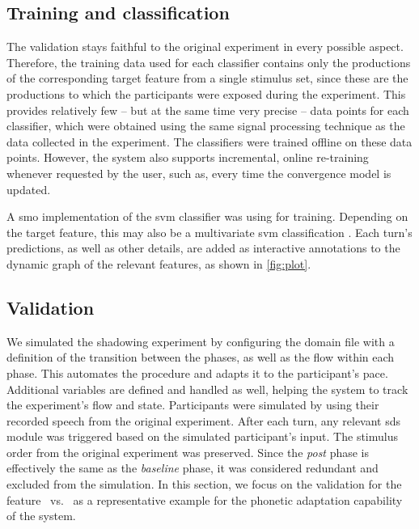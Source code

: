 \subsection{Training and classification}
\label{subsec:training_and_classification}

The validation stays faithful to the original experiment in every possible aspect.
Therefore, the training data used for each classifier contains only the productions of the corresponding target feature from a single stimulus set, since these are the productions to which the participants were exposed during the experiment.
This provides relatively few -- but at the same time very precise -- data points for each classifier,
which were obtained using the same signal processing technique as the data collected in the experiment.
The classifiers were trained offline on these data points.
However, the system also supports incremental, online re-training whenever requested by the user,
such as, every time the convergence model is updated.

A \ac{smo} \citep{Platt1999fast, Platt1998sequential} implementation of the \ac{svm} classifier \citep{Vapnik1998support} was using for training.
Depending on the target feature, this may also be a multivariate \ac{svm} classification \citep[e.g.,][]{Joachims2005support}.
Each turn's predictions, as well as other details, are added as interactive annotations to the dynamic graph of the relevant features, as shown in \cref{fig:plot}.

\subsection{Validation}
\label{subsec:validation}

We simulated the shadowing experiment by configuring the domain file with a definition of the transition between the phases, as well as the flow within each phase.
This automates the procedure and adapts it to the participant's pace.
Additional variables are defined and handled as well, helping the system to track the experiment's flow and state.
Participants were simulated by using their recorded speech from the original experiment.
After each turn, any relevant \ac{sds} module was triggered based on the simulated participant's input.
The stimulus order from the original experiment was preserved.
Since the \emph{post} phase is effectively the same as the \emph{baseline} phase, it was considered redundant and excluded from the simulation.
In this section, we focus on the validation for the feature \textipa{[E:]}~vs.~\textipa{[e:]} as a representative example for the phonetic adaptation capability of the system.

